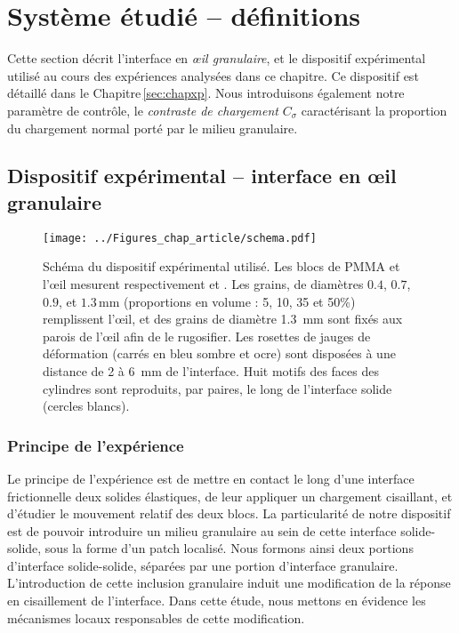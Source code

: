 \newpage

\minitoc


\newpage








\section{Système étudié -- définitions}

Cette section décrit l'interface en \textit{œil granulaire}, et le dispositif expérimental utilisé au cours des expériences analysées dans ce chapitre. Ce dispositif est détaillé dans le Chapitre\,\ref{sec:chapxp}. Nous introduisons également notre paramètre de contrôle, le \textit{contraste de chargement} $C_\sigma$ caractérisant la proportion du chargement normal porté par le milieu granulaire.




\subsection{Dispositif expérimental -- interface en œil granulaire}


\begin{figure}[htb]
\centering
\texttt{[image: ../Figures\_chap\_article/schema.pdf]}
\caption[Schéma de l'œil granulaire]{Schéma du dispositif expérimental utilisé. Les blocs de PMMA et l'œil mesurent respectivement  et . Les grains, de diamètres $0.4$, $0.7$, $0.9$, et $1.3$\,mm (proportions en volume : 5, 10, 35 et 50\%) remplissent l'œil, et des grains de diamètre \SI{1.3}{\milli\meter} sont fixés aux parois de l'œil afin de le rugosifier. Les rosettes de jauges de déformation (carrés en bleu sombre et ocre) sont disposées à une distance de 2 à \SI{6}{\milli\meter} de l'interface. Huit motifs des faces des cylindres sont reproduits, par paires, le long de l'interface solide (cercles blancs).}
\label{fig:granuleyedetail}
\end{figure}



\subsubsection{Principe de l'expérience}

Le principe de l'expérience est de mettre en contact le long d'une interface frictionnelle deux solides élastiques, de leur appliquer un chargement cisaillant, et d'étudier le mouvement relatif des deux blocs. La particularité de notre dispositif est de pouvoir introduire un milieu granulaire au sein de cette interface solide-solide, sous la forme d'un patch localisé. Nous formons ainsi deux portions d'interface solide-solide, séparées par une portion d'interface granulaire. L'introduction de cette inclusion granulaire induit une modification de la réponse en cisaillement de l'interface. Dans cette étude, nous mettons en évidence les mécanismes locaux responsables de cette modification.

